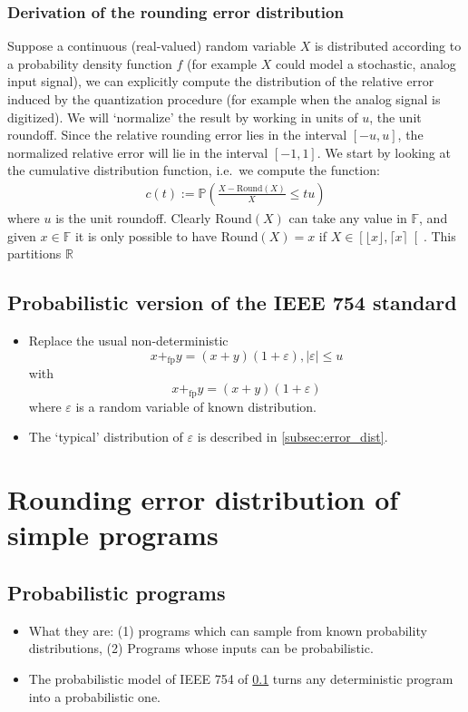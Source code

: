 \documentclass[10pt,conference]{IEEEtran}
\newcommand{\ie}{i.e.\ }
\newcommand{\round}{\mathrm{Round}}
\newcommand{\pfp}{+_{\mathrm{fp}}}
\newcommand{\absv}[1]{\vert #1\vert}
\newcommand{\Pro}{\mathbb{P}}
\newcommand{\F}{\mathbb{F}}
\newcommand{\R}{\mathbb{R}}
\newcommand{\ceil}[1]{\lceil #1 \rceil}
\newcommand{\floor}[1]{\lfloor #1 \rfloor}
\begin{document}
\subsubsection{Derivation of the rounding error distribution}
Suppose a continuous (real-valued) random variable $X$ is distributed according to a probability density function $f$ (for example $X$ could model a stochastic, analog input signal), we can explicitly compute the distribution of the relative error induced by the quantization procedure (for example when the analog signal is digitized). We will `normalize' the result by working in units of $u$, the unit roundoff. Since the relative rounding error lies in the interval $[-u,u]$, the normalized relative error will lie in the interval $[-1,1]$.  We start by looking at the cumulative distribution function, \ie we compute the function:
\begin{align*}
c(t):=\Pro\left(\frac{X-\round(X)}{X}\leq tu\right)
\end{align*}
where $u$ is the unit roundoff. Clearly $\round(X)$ can take any value in $\F$, and given $x\in\F$ it is only possible to have $\round(X)=x$ if $X\in \left[\floor{x},\ceil{x}\right[$. This partitions $\R$

\subsection{Probabilistic version of the IEEE 754 standard}\label{subsec:prob_ieee754}

\begin{itemize}
\item Replace the usual non-deterministic 
\[
x\pfp y=(x+y)(1+\varepsilon), \absv{\varepsilon}\leq u
\]
with
\[
x\pfp y=(x+y)(1+\varepsilon)
\]
where $\varepsilon$ is a random variable of known distribution.
\item The `typical' distribution of $\varepsilon$ is described in \cref{subsec:error_dist}.
\end{itemize}

\section{Rounding error distribution of simple programs}

\subsection{Probabilistic programs}
\begin{itemize}
\item What they are: (1) programs which can sample from known probability distributions, (2) Programs whose inputs can be probabilistic.
\item The probabilistic model of IEEE 754 of \cref{subsec:prob_ieee754} turns any deterministic program into a probabilistic one.
\end{itemize}
\end{document}
